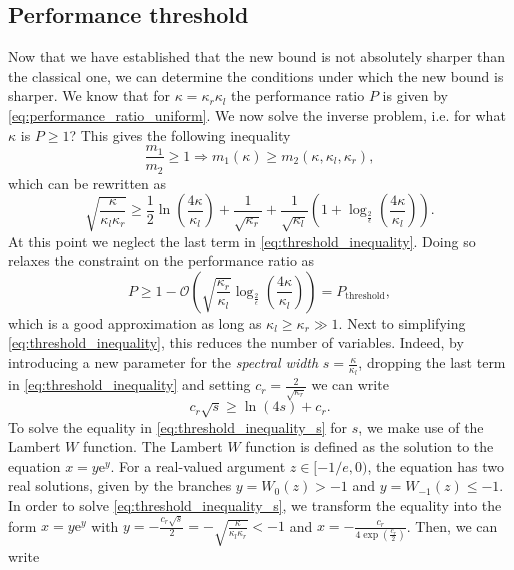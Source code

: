 \subsection{Performance threshold}\label{sec:performance_threshold}
Now that we have established that the new bound is not absolutely sharper than the classical one, we can determine the conditions under which the new bound is sharper. We know that for $\kappa=\kappa_r\kappa_l$ the performance ratio $P$ is given by \cref{eq:performance_ratio_uniform}. We now solve the inverse problem, i.e. for what $\kappa$ is $P \geq 1$? This gives the following inequality
\[
    \frac{m_1}{m_2} \geq 1 \Rightarrow m_1(\kappa) \geq m_2(\kappa, \kappa_l, \kappa_r),
\]
which can be rewritten as
\begin{equation}
    \sqrt{\frac{\kappa}{\kappa_l\kappa_r}} \geq \frac{1}{2}\ln\left(\frac{4\kappa}{\kappa_l}\right) + \frac{1}{\sqrt{\kappa_r}} + \frac{1}{\sqrt{\kappa_l}}\left(1 + \log_{\frac{2}{\epsilon}}\left(\frac{4\kappa}{\kappa_l}\right)\right).
    \label{eq:threshold_inequality}
\end{equation}
At this point we neglect the last term in \cref{eq:threshold_inequality}. Doing so relaxes the constraint on the performance ratio as
\begin{equation}
    P \geq 1 - \mathcal{O}\left(\sqrt{\frac{\kappa_r}{\kappa_l}}\log_{\frac{2}{\epsilon}}\left(\frac{4\kappa}{\kappa_l}\right)\right) = P_{\text{threshold}},
    \label{eq:approximate_performance_ratio_threshold}
\end{equation}
which is a good approximation as long as $\kappa_l \geq \kappa_r \gg 1$. Next to simplifying \cref{eq:threshold_inequality}, this reduces the number of variables. Indeed, by introducing a new parameter for the \textit{spectral width} $s = \frac{\kappa}{\kappa_l}$, dropping the last term in \cref{eq:threshold_inequality} and setting $c_r = \frac{2}{\sqrt{\kappa_r}}$ we can write
\begin{equation}
    c_r\sqrt{s} \geq \ln\left(4s\right) + c_r.
    \label{eq:threshold_inequality_s}
\end{equation}
To solve the equality in \cref{eq:threshold_inequality_s} for $s$, we make use of the Lambert $W$ function. The Lambert $W$ function is defined as the solution to the equation $x = y\mathrm{e}^y$. For a real-valued argument $z \in [-1/e, 0)$, the equation has two real solutions, given by the branches $y = W_0(z) > -1$ and $y = W_{-1}(z) \leq -1$. In order to solve \cref{eq:threshold_inequality_s}, we transform the equality into the form $x = y \mathrm{e}^y$ with $y = -\frac{c_r\sqrt{s}}{2} = -\sqrt{\frac{\kappa}{\kappa_l\kappa_r}} < -1$ and $x = -\frac{c_r}{4\exp\left(\frac{c_r}{2}\right)}$. Then, we can write
